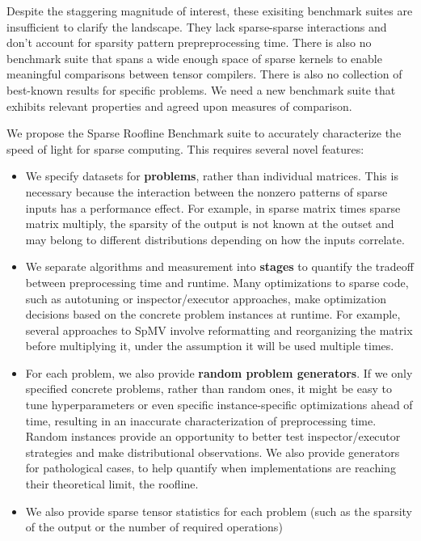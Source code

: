 \documentclass{article}
\begin{document}
Despite the staggering magnitude of interest, these exisiting benchmark suites are insufficient to clarify the landscape.
%
They lack sparse-sparse interactions and don’t account for sparsity pattern prepreprocessing time.
%
There is also no benchmark suite that spans a wide enough space of sparse kernels to enable meaningful comparisons between tensor compilers.
%
There is also no collection of best-known results for specific problems.
%
We need a new benchmark suite that exhibits relevant properties and agreed upon measures of comparison.

We propose the Sparse Roofline Benchmark suite to accurately characterize the speed of light for sparse computing.
%
This requires several novel features:
\begin{itemize}
	\item We specify datasets for \textbf{problems}, rather than individual matrices.
	This is necessary because the interaction between the nonzero patterns of sparse inputs has a performance effect.
	For example, in sparse matrix times sparse matrix multiply, the sparsity of the output is not known at the outset and may belong to different distributions depending on how the inputs correlate. 
	\item We separate algorithms and measurement into \textbf{stages} to quantify the tradeoff between preprocessing time and runtime.
	Many optimizations to sparse code, such as autotuning or inspector/executor approaches, make optimization decisions based on the concrete problem instances at runtime.
	For example, several approaches to SpMV involve reformatting and reorganizing the matrix before multiplying it, under the assumption it will be used multiple times.
	\item For each problem, we also provide \textbf{random problem generators}.
	If we only specified concrete problems, rather than random ones, it might be easy to tune hyperparameters or even specific instance-specific optimizations ahead of time, resulting
	in an inaccurate characterization of preprocessing time.
	Random instances provide an opportunity to better test inspector/executor strategies and make distributional observations.
	We also provide generators for pathological cases, to help quantify when implementations are reaching their theoretical limit, the roofline.
	\item
	We also provide sparse tensor statistics for each problem (such as the sparsity of the output or the number of required operations) 
\end{itemize}
\end{document}
